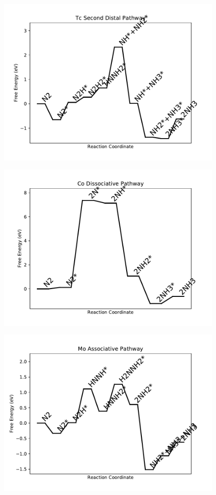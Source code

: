 \begin{figure}
\includegraphics[width=0.8\linewidth]{data/plots/Tc_distal_2.pdf}
\label{fig:Tc_distal_2}
\end{figure}

\begin{figure}
\includegraphics[width=0.8\linewidth]{data/plots/Co_dissociative.pdf}
\label{fig:Co_dissociative}
\end{figure}

\begin{figure}
\includegraphics[width=0.8\linewidth]{data/plots/Mo_associative.pdf}
\label{fig:Mo_associative}
\end{figure}


